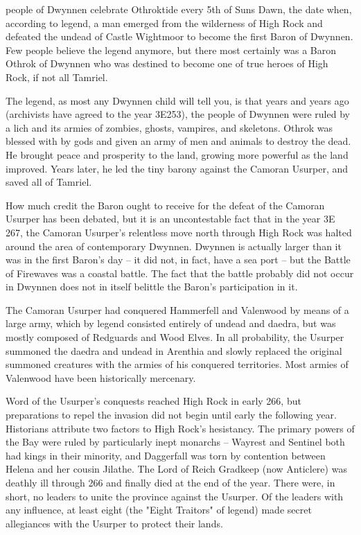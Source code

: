 
 people of Dwynnen celebrate Othroktide every 5th of Suns Dawn, the date when, according to legend, a man emerged from the wilderness of High Rock and defeated the undead of Castle Wightmoor to become the first Baron of Dwynnen. Few people believe the legend anymore, but there most certainly was a Baron Othrok of Dwynnen who was destined to become one of true heroes of High Rock, if not all Tamriel.

The legend, as most any Dwynnen child will tell you, is that years and years ago (archivists have agreed to the year 3E253), the people of Dwynnen were ruled by a lich and its armies of zombies, ghosts, vampires, and skeletons. Othrok was blessed with by gods and given an army of men and animals to destroy the dead. He brought peace and prosperity to the land, growing more powerful as the land improved. Years later, he led the tiny barony against the Camoran Usurper, and saved all of Tamriel.

How much credit the Baron ought to receive for the defeat of the Camoran Usurper has been debated, but it is an uncontestable fact that in the year 3E 267, the Camoran Usurper's relentless move north through High Rock was halted around the area of contemporary Dwynnen. Dwynnen is actually larger than it was in the first Baron's day -- it did not, in fact, have a sea port -- but the Battle of Firewaves was a coastal battle. The fact that the battle probably did not occur in Dwynnen does not in itself belittle the Baron's participation in it.

The Camoran Usurper had conquered Hammerfell and Valenwood by means of a large army, which by legend consisted entirely of undead and daedra, but was mostly composed of Redguards and Wood Elves. In all probability, the Usurper summoned the daedra and undead in Arenthia and slowly replaced the original summoned creatures with the armies of his conquered territories. Most armies of Valenwood have been historically mercenary.

Word of the Usurper's conquests reached High Rock in early 266, but preparations to repel the invasion did not begin until early the following year. Historians attribute two factors to High Rock's hesistancy. The primary powers of the Bay were ruled by particularly inept monarchs -- Wayrest and Sentinel both had kings in their minority, and Daggerfall was torn by contention between Helena and her cousin Jilathe. The Lord of Reich Gradkeep (now Anticlere) was deathly ill through 266 and finally died at the end of the year. There were, in short, no leaders to unite the province against the Usurper. Of the leaders with any influence, at least eight (the "Eight Traitors" of legend) made secret allegiances with the Usurper to protect their lands.

